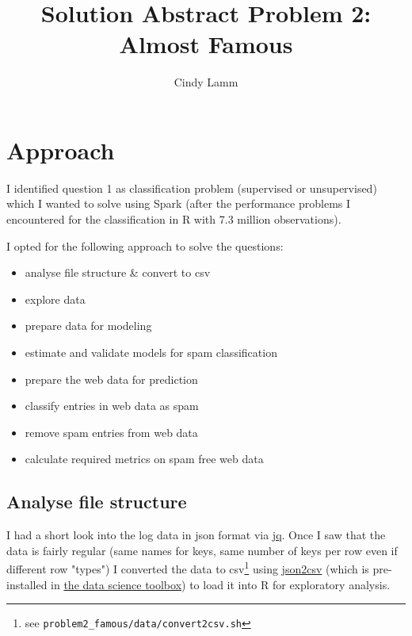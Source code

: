 \documentclass{article}\usepackage[]{graphicx}\usepackage[]{color}
\begin{document}
\VerbatimFootnotes

\author{Cindy Lamm}
\title{Solution Abstract Problem 2: Almost Famous}

\maketitle


\section{Approach} %
\label{approach}

I identified question 1 as classification problem (supervised or unsupervised) which I wanted to solve using Spark (after the performance problems I encountered for the classification in R with 7.3 million observations). 

I opted for the following approach to solve the questions:
\begin{itemize}
	\item analyse file structure \& convert to csv
	\item explore data
	\item prepare data for modeling
	\item estimate and validate models for spam classification
	\item prepare the web data for prediction
	\item classify entries in web data as spam
	\item remove spam entries from web data
	\item calculate required metrics on spam free web data
\end{itemize}



\subsection{Analyse file structure} %
\label{sub:analyse_file_structure}
I had a short look into the log data in json format via \href{http://stedolan.github.io/jq/}{jq}. Once I saw that the data is fairly regular (same names for keys, same number of keys per row even if different row "types") I converted the data to csv\footnote{see \verb+problem2_famous/data/convert2csv.sh+} using \href{https://github.com/zemirco/json2csv}{json2csv} (which is pre-installed in \href{http://datasciencetoolbox.org/}{the data science toolbox}) to load it into R for exploratory analysis.
\end{document}
